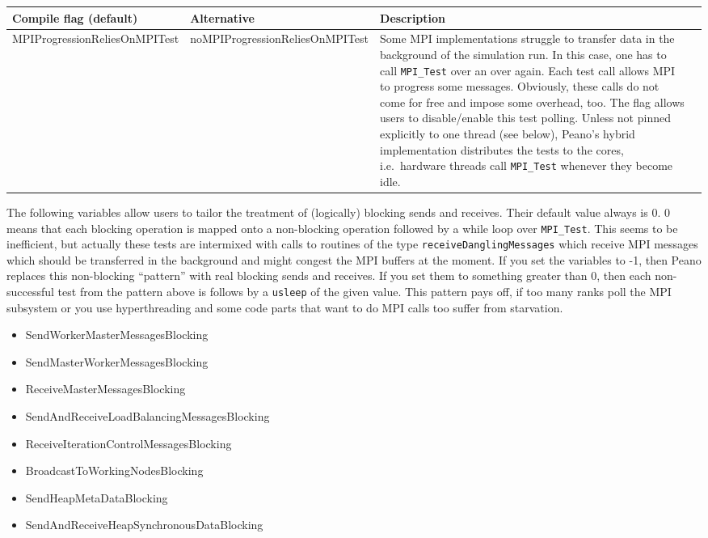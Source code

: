 \begin{center}
 \begin{tabular}{p{2cm}p{2cm}p{9.5cm}l}
  Compile flag (default) & Alternative & Description \\
  \hline
  {\footnotesize MPI\-Progression\-Relies\-On\-MPI\-Test} 
  & 
  {\footnotesize noMPI\-Progression\-Relies\-On\-MPI\-Test} 
  &
  Some MPI implementations struggle to transfer data in the background of the
  simulation run. In this case, one has to call \texttt{MPI\_Test} over an over
  again. Each test call allows MPI to progress some messages. Obviously,
  these calls do not come for free and impose some overhead, too. The flag
  allows users to disable/enable this test polling. Unless not pinned
  explicitly to one thread (see below), Peano's hybrid implementation
  distributes the tests to the cores, i.e.~hardware threads call 
  \texttt{MPI\_Test} whenever they become idle.
  \\
  \hline
 \end{tabular}
\end{center}


\noindent
The following variables allow users to tailor the treatment of (logically)
blocking sends and receives.
Their default value always is 0. 
0 means that each blocking operation is mapped onto a non-blocking operation
followed by a while loop over \texttt{MPI\_Test}. 
This seems to be inefficient, but actually these tests are intermixed with calls
to routines of the type \texttt{receiveDanglingMessages} which receive MPI
messages which should be transferred in the background and might congest the MPI
buffers at the moment.
If you set the variables to -1, then Peano replaces this non-blocking
``pattern'' with real blocking sends and receives.
If you set them to something greater than 0, then each non-successful test from
the pattern above is follows by a \texttt{usleep} of the given value. 
This pattern pays off, if too many ranks poll the MPI subsystem or you use
hyperthreading and some code parts that want to do MPI calls too suffer
from starvation.

\begin{itemize}
  \item SendWorkerMasterMessagesBlocking
  \item SendMasterWorkerMessagesBlocking
  \item ReceiveMasterMessagesBlocking
  \item SendAndReceiveLoadBalancingMessagesBlocking
  \item ReceiveIterationControlMessagesBlocking
  \item BroadcastToWorkingNodesBlocking
  \item SendHeapMetaDataBlocking
  \item SendAndReceiveHeapSynchronousDataBlocking
\end{itemize}  



